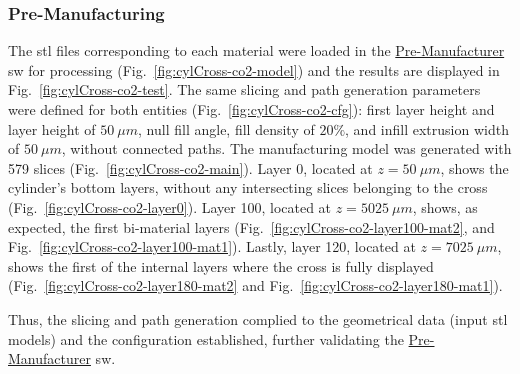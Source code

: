 \subsubsection{Pre-Manufacturing}%
\label{sec:pre-manufacturing-co2}
The \gls{stl} files corresponding to each material were loaded in the
\underline{Pre-Manufacturer} \gls{sw} for processing
(Fig.~\ref{fig:cylCross-co2-model}) and the results are displayed in Fig.~\ref{fig:cylCross-co2-test}. The same slicing and path generation
parameters were defined for both entities (Fig.~\ref{fig:cylCross-co2-cfg}):
first layer height and layer height of $50~\mu m$, null fill angle, fill density
of $20\%$, and infill extrusion width of $50~\mu m$, without connected
paths.
%
The manufacturing model was generated with 579 slices
(Fig.~\ref{fig:cylCross-co2-main}). Layer $0$, located at $z = 50~\mu m$, shows the
cylinder's bottom layers, without any intersecting slices belonging to the cross
(Fig.~\ref{fig:cylCross-co2-layer0}).
Layer 100, located at
$z = 5025~\mu m$, shows, as expected, the first bi-material layers (Fig.~\ref{fig:cylCross-co2-layer100-mat2}, and
Fig.~\ref{fig:cylCross-co2-layer100-mat1}).
Lastly, layer 120, located at $z = 7025~\mu m$, shows the first of the internal
layers where the cross is fully displayed
(Fig.~\ref{fig:cylCross-co2-layer180-mat2} and Fig.~\ref{fig:cylCross-co2-layer180-mat1}).

Thus, the slicing and path generation complied to the geometrical data (input
\gls{stl} models) and the configuration established, further validating the \underline{Pre-Manufacturer} \gls{sw}.

